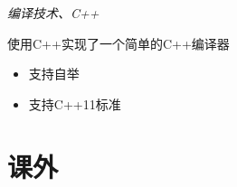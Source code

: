 \documentclass{uniquecv}
\begin{document}
\textit{编译技术、C++}
\vspace{1.5ex}

\begin{spacing}{0.1}

使用C++实现了一个简单的C++编译器
\begin{itemize}
  \item 支持自举
  \item 支持C++11标准
\end{itemize}

\end{spacing}



\section{课外}
\end{document}
